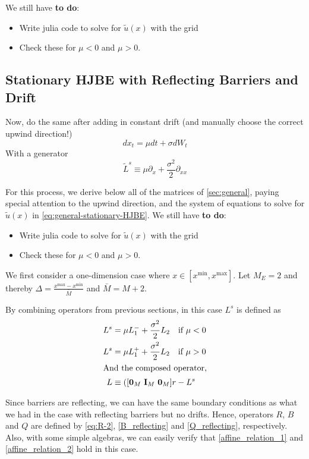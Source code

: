 \documentclass[11pt]{article}
\newcommand{\D}[1][]{\ensuremath{\partial_{#1}}}
\begin{document}
We still have \textbf{to do}:
\begin{itemize}
	\item Write julia code to solve for $\tilde{u}(x)$ with the grid
	\item Check these for $\mu < 0$ and $\mu > 0$.
\end{itemize}

\subsection{Stationary HJBE with Reflecting Barriers and Drift}
Now, do the same after adding in constant drift (and manually choose the correct upwind direction!)
$$
d x_t = \mu dt + \sigma d W_t
$$
With a generator
$$
	\tilde{L}^s \equiv \mu \D[x] + \frac{\sigma^2}{2}\D[xx]
$$

For this process, we derive below all of the matrices of \cref{sec:general}, paying special attention to the upwind direction, and the system of equations to solve for $\tilde{u}(x)$ in \cref{eq:general-stationary-HJBE}. We still have \textbf{to do}:
\begin{itemize}
	\item Write julia code to solve for $\tilde{u}(x)$ with the grid
	\item Check these for $\mu < 0$ and $\mu > 0$.
\end{itemize}

We first consider a one-dimension case where $x\in [x^{\min},x^{\max}]$. Let $M_E = 2$ and thereby $\Delta  = \frac{x^{\max}-x^{\min}}{\bar{M}}$ and $\bar{M} = M+2$.

By combining operators from previous sections, in this case $L^s$ is defined as
\begin{align}
L^s &= \mu L_1^{-} +\frac{\sigma^2}{2}L_2\quad\text{if }\mu<0\\
L^s &=\mu L_1^{+} +\frac{\sigma^2}{2}L_2\quad\text{if }\mu>0\\
\intertext{And the composed operator,}
	L &\equiv ([\mathbf{0}_{M} \text{ } \mathbf{I}_{M} \text{ } \mathbf{0}_{M}] r -  L^s
\end{align}

Since barriers are reflecting, we can have the same boundary conditions as what we had in the case with reflecting barriers but no drifts. Hence, operators $R$, $B$ and $Q$ are defined by \cref{eq:R-2}, \cref{B_reflecting} and \cref{Q_reflecting}, respectively. Also, with some simple algebras, we can easily verify that \cref{affine_relation_1} and \cref{affine_relation_2} hold in this case.
\end{document}
